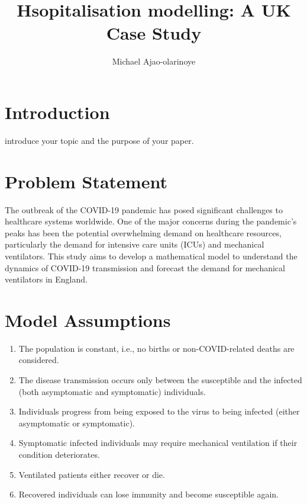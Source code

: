 \documentclass[lettersize, journal]{IEEEtran}
\begin{document}
\title{Hsopitalisation modelling: A UK Case Study}
\author{Michael Ajao-olarinoye}

\maketitle


\begin{abstract}

\end{abstract}

\begin{IEEEkeywords}

\end{IEEEkeywords}

\section{Introduction}
 introduce your topic and the purpose of your paper.
\section{Problem Statement}

The outbreak of the COVID-19 pandemic has posed significant challenges to healthcare systems worldwide. One of the major concerns during the pandemic's peaks has been the potential overwhelming demand on healthcare resources, particularly the demand for intensive care units (ICUs) and mechanical ventilators. This study aims to develop a mathematical model to understand the dynamics of COVID-19 transmission and forecast the demand for mechanical ventilators in England.

\section{Model Assumptions}

\begin{enumerate}
    \item The population is constant, i.e., no births or non-COVID-related deaths are considered.
    \item The disease transmission occurs only between the susceptible and the infected (both asymptomatic and symptomatic) individuals.
    \item Individuals progress from being exposed to the virus to being infected (either asymptomatic or symptomatic).
    \item Symptomatic infected individuals may require mechanical ventilation if their condition deteriorates.
    \item Ventilated patients either recover or die.
    \item Recovered individuals can lose immunity and become susceptible again.
\end{enumerate}
\end{document}
